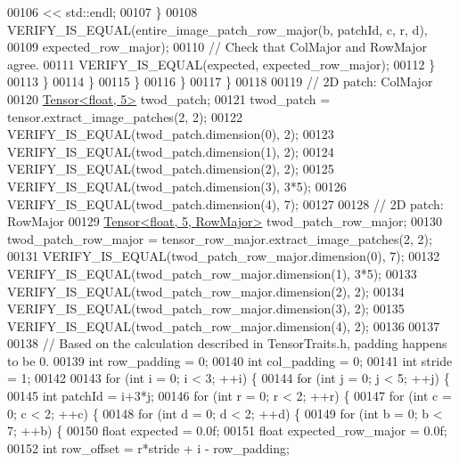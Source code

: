 \begin{DoxyCode}
00106                      << std::endl;
00107               \}
00108               VERIFY\_IS\_EQUAL(entire\_image\_patch\_row\_major(b, patchId, c, r, d),
00109                               expected\_row\_major);
00110               \textcolor{comment}{// Check that ColMajor and RowMajor agree.}
00111               VERIFY\_IS\_EQUAL(expected, expected\_row\_major);
00112             \}
00113           \}
00114         \}
00115       \}
00116     \}
00117   \}
00118 
00119   \textcolor{comment}{// 2D patch: ColMajor}
00120   \hyperlink{class_eigen_1_1_tensor}{Tensor<float, 5>} twod\_patch;
00121   twod\_patch = tensor.extract\_image\_patches(2, 2);
00122   VERIFY\_IS\_EQUAL(twod\_patch.dimension(0), 2);
00123   VERIFY\_IS\_EQUAL(twod\_patch.dimension(1), 2);
00124   VERIFY\_IS\_EQUAL(twod\_patch.dimension(2), 2);
00125   VERIFY\_IS\_EQUAL(twod\_patch.dimension(3), 3*5);
00126   VERIFY\_IS\_EQUAL(twod\_patch.dimension(4), 7);
00127 
00128   \textcolor{comment}{// 2D patch: RowMajor}
00129   \hyperlink{class_eigen_1_1_tensor}{Tensor<float, 5, RowMajor>} twod\_patch\_row\_major;
00130   twod\_patch\_row\_major = tensor\_row\_major.extract\_image\_patches(2, 2);
00131   VERIFY\_IS\_EQUAL(twod\_patch\_row\_major.dimension(0), 7);
00132   VERIFY\_IS\_EQUAL(twod\_patch\_row\_major.dimension(1), 3*5);
00133   VERIFY\_IS\_EQUAL(twod\_patch\_row\_major.dimension(2), 2);
00134   VERIFY\_IS\_EQUAL(twod\_patch\_row\_major.dimension(3), 2);
00135   VERIFY\_IS\_EQUAL(twod\_patch\_row\_major.dimension(4), 2);
00136 
00137 
00138   \textcolor{comment}{// Based on the calculation described in TensorTraits.h, padding happens to be 0.}
00139   \textcolor{keywordtype}{int} row\_padding = 0;
00140   \textcolor{keywordtype}{int} col\_padding = 0;
00141   \textcolor{keywordtype}{int} stride = 1;
00142 
00143   \textcolor{keywordflow}{for} (\textcolor{keywordtype}{int} i = 0; i < 3; ++i) \{
00144     \textcolor{keywordflow}{for} (\textcolor{keywordtype}{int} j = 0; j < 5; ++j) \{
00145       \textcolor{keywordtype}{int} patchId = i+3*j;
00146       \textcolor{keywordflow}{for} (\textcolor{keywordtype}{int} r = 0; r < 2; ++r) \{
00147         \textcolor{keywordflow}{for} (\textcolor{keywordtype}{int} c = 0; c < 2; ++c) \{
00148           \textcolor{keywordflow}{for} (\textcolor{keywordtype}{int} d = 0; d < 2; ++d) \{
00149             \textcolor{keywordflow}{for} (\textcolor{keywordtype}{int} b = 0; b < 7; ++b) \{
00150               \textcolor{keywordtype}{float} expected = 0.0f;
00151               \textcolor{keywordtype}{float} expected\_row\_major = 0.0f;
00152               \textcolor{keywordtype}{int} row\_offset = r*stride + i - row\_padding;

\end{DoxyCode}
